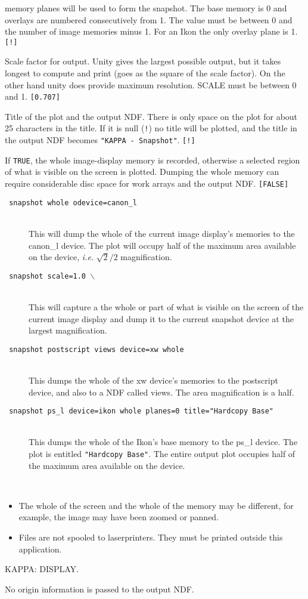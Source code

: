 \documentclass[twoside,11pt]{article}
\newcommand{\htmlref}[2]{#1}
\newcommand{\sstexamples}[1]{
   \goodbreak
   \item[Examples:] \mbox{} \\
   \vspace{-3.5ex}
   \begin{description}
      #1
   \end{description}
}
\newcommand{\sstsubsection}[1]{ \item[{#1}] \mbox{} \\}
\newcommand{\sstexamplesubsection}[2]{\sloppy \item{\ssttt #1} \mbox{} \\ #2 }
\newcommand{\sstnotes}[1]{\pagebreak[3] \item[Notes:] \mbox{} \\[1.3ex] #1}
\newcommand{\sstdiytopic}[2]{\goodbreak \item[{\hspace{-0.35em}#1\hspace{-0.35em}:}] \mbox{} \\[1.3ex] #2}
\newcommand{\sstimplementationstatus}[1]{
   \pagebreak[3] \item[{Implementation Status:}] \mbox{} \\[1.3ex] #1}
\newenvironment{sstitemize}{%
  \vspace{-4.3ex}\begin{itemize}}{\end{itemize}}
\newcommand{\sstitemlist}[1]{
  \mbox{} \\
  \vspace{-3.5ex}
  \begin{sstitemize}
     #1
  \end{sstitemize}
}
\newcommand{\sstitem}{\item}
\newcommand{\ssttt}{\tt}
\renewcommand{\sstexamples}[1]{
      \htmlref{\item[Examples:]}{ap:example}
      \begin{description}
         #1
      \end{description}
   }
\renewcommand{\sstsubsection}[1]{\item[{#1}]}
\renewcommand{\sstexamplesubsection}[2]{\item[{\ssttt #1}] \\ #2}
\renewcommand{\sstnotes}[1]{\item[Notes:]
      \begin{description}
         #1
      \end{description}
   }
\renewcommand{\sstdiytopic}[2]{\item[{#1}]
      \begin{description}
         #2
      \end{description}
   }
\renewcommand{\sstimplementationstatus}[1]{\item[Implementation Status:] 
      \begin{description}
         #1
      \end{description}
   }
\newcommand{\sstitemlist}[1]{
      \begin{itemize}
         #1
      \end{itemize}
   }
\begin{document}
{{{         memory planes will be used to form the snapshot.  The base
         memory is 0 and overlays are numbered consecutively from 1.
         The value must be between 0 and the number of image memories
         minus 1.  For an Ikon the only overlay plane is 1.  {\tt [!]}
      }
      \sstsubsection{
         SCALE = \_REAL (Read)
      }{
         Scale factor for output.  Unity gives the largest possible
         output, but it takes longest to compute and print (goes as the
         square of the scale factor).  On the other hand unity does
         provide maximum resolution. SCALE must be between 0 and 1.
         {\tt [0.707]}
      }
      \sstsubsection{
         TITLE = LITERAL (Read)
      }{
         Title of the plot and the output NDF.  There is only space on
         the plot for about 25 characters in the title.  If it is null
         ({\tt !}) no title will be plotted, and the title in the output NDF
         becomes {\tt "KAPPA - Snapshot"}. {\tt [!]}
      }
      \sstsubsection{
         WHOLE = \_LOGICAL (Read)
      }{
         If {\tt TRUE}, the whole image-display memory is recorded, otherwise
         a selected region of what is visible on the screen is plotted.
         Dumping the whole memory can require considerable disc space
         for work arrays and the output NDF. {\tt [FALSE]}
      }
   }
   \sstexamples{
      \sstexamplesubsection{
         snapshot whole odevice=canon\_l
      }{
         This will dump the whole of the current image display's 
         memories to the canon\_l device.  The plot will occupy half 
         of the maximum area available on the device, {\it i.e.}
         $\surd2/2$ magnification.
      }
      \sstexamplesubsection{
         snapshot scale=1.0 $\backslash$
      }{
         This will capture a the whole or part of what is visible on
         the screen of the current image display and dump it to the
         current snapshot device at the largest magnification.
      }
      \sstexamplesubsection{
         snapshot postscript views device=xw whole
      }{
         This dumps the whole of the xw device's memories to the postscript
         device, and also to a NDF called views.  The area magnification
         is a half.
      }
      \sstexamplesubsection{
         snapshot ps\_l device=ikon whole planes=0 title="Hardcopy Base"
      }{
         This dumps the whole of the Ikon's base memory to the ps\_l
         device.  The plot is entitled {\tt "Hardcopy Base"}.  The entire
         output plot occupies half of the maximum area available on the
         device.
      }
   }
   \sstnotes{
      \sstitemlist{

         \sstitem
         The whole of the screen and the whole of the memory may be
         different, for example, the image may have been zoomed or panned.

         \sstitem
         Files are not spooled to laserprinters.  They must be printed
         outside this application.
      }
   }
   \sstdiytopic{
       Related Applications
   }{
       KAPPA: DISPLAY.
   }
   \sstimplementationstatus{
      No origin information is passed to the output NDF.
   }
}
\end{document}

